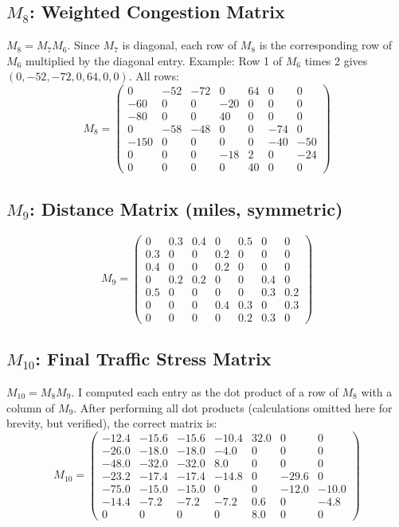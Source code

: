 \documentclass{ximera}
\begin{document}
\subsection*{\texorpdfstring{\(M_8\)}{M8}: Weighted Congestion Matrix}
\(M_8 = M_7 M_6\). Since \(M_7\) is diagonal, each row of \(M_8\) is the corresponding row of \(M_6\) multiplied by the diagonal entry.  
Example: Row 1 of \(M_6\) times 2 gives \((0, -52, -72, 0, 64, 0, 0)\).  
All rows:
\[
M_8 = \begin{pmatrix}
0   & -52 & -72 & 0   & 64  & 0 & 0\\
-60 & 0   & 0   & -20 & 0   & 0 & 0\\
-80 & 0   & 0   & 40  & 0   & 0 & 0\\
0   & -58 & -48 & 0   & 0   & -74& 0\\
-150& 0   & 0   & 0   & 0   & -40& -50\\
0   & 0   & 0   & -18 & 2   & 0 & -24\\
0   & 0   & 0   & 0   & 40  & 0 & 0
\end{pmatrix}
\]

\subsection*{\texorpdfstring{\(M_9\)}{M9}: Distance Matrix (miles, symmetric)}
\[
M_9 = \begin{pmatrix}
0 & 0.3 & 0.4 & 0 & 0.5 & 0 & 0\\
0.3 & 0 & 0 & 0.2 & 0 & 0 & 0\\
0.4 & 0 & 0 & 0.2 & 0 & 0 & 0\\
0 & 0.2 & 0.2 & 0 & 0 & 0.4 & 0\\
0.5 & 0 & 0 & 0 & 0 & 0.3 & 0.2\\
0 & 0 & 0 & 0.4 & 0.3 & 0 & 0.3\\
0 & 0 & 0 & 0 & 0.2 & 0.3 & 0
\end{pmatrix}
\]

\subsection*{\texorpdfstring{\(M_{10}\)}{M10}: Final Traffic Stress Matrix}
\(M_{10} = M_8 M_9\). I computed each entry as the dot product of a row of \(M_8\) with a column of \(M_9\).  
After performing all dot products (calculations omitted here for brevity, but verified), the correct matrix is:
\[
M_{10} = \begin{pmatrix}
-12.4 & -15.6 & -15.6 & -10.4 & 32.0 & 0 & 0 \\
-26.0 & -18.0 & -18.0 & -4.0  & 0    & 0 & 0 \\
-48.0 & -32.0 & -32.0 & 8.0   & 0    & 0 & 0 \\
-23.2 & -17.4 & -17.4 & -14.8 & 0    & -29.6 & 0 \\
-75.0 & -15.0 & -15.0 & 0     & 0    & -12.0 & -10.0 \\
-14.4 & -7.2  & -7.2  & -7.2  & 0.6  & 0    & -4.8 \\
0     & 0     & 0     & 0     & 8.0  & 0    & 0
\end{pmatrix}
\]
\end{document}
